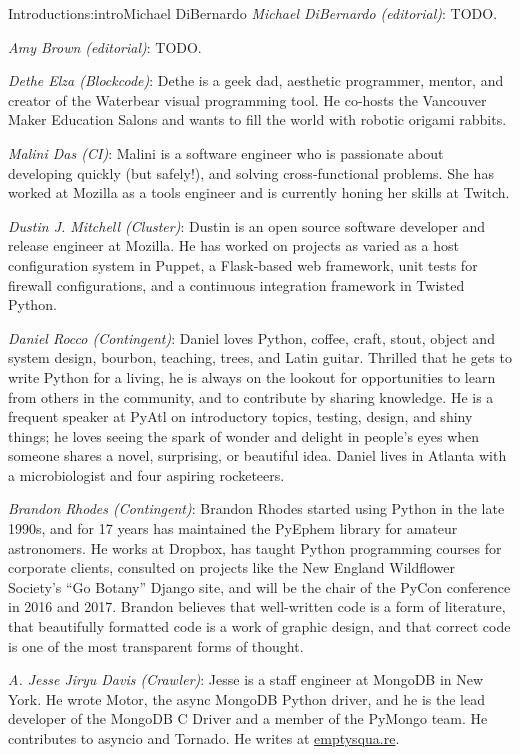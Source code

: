 \begin{aosachapter}{Introduction}{s:intro}{Michael DiBernardo}
\hspace{\parindent} \emph{Michael DiBernardo (editorial)}: TODO.

\hspace{\parindent} \emph{Amy Brown (editorial)}: TODO.

\emph{Dethe Elza (Blockcode)}: Dethe is a geek dad, aesthetic programmer, mentor, and creator of the Waterbear visual programming tool. He co-hosts the Vancouver Maker Education Salons and wants to fill the world with robotic origami rabbits. 

\emph{Malini Das (CI)}: Malini is a software engineer who is passionate about developing quickly (but safely!), and solving cross-functional problems. She has worked at Mozilla as a tools engineer and is currently honing her skills at Twitch. 

\emph{Dustin J. Mitchell (Cluster)}: Dustin is an open source software developer and release engineer at Mozilla. He has worked on projects as varied as a host configuration system in Puppet, a Flask-based web framework, unit tests for firewall configurations, and a continuous integration framework in Twisted Python. 

\emph{Daniel Rocco (Contingent)}: Daniel loves Python, coffee, craft, stout, object and system design, bourbon, teaching, trees, and Latin guitar. Thrilled that he gets to write Python for a living, he is always on the lookout for opportunities to learn from others in the community, and to contribute by sharing knowledge. He is a frequent speaker at PyAtl on introductory topics, testing, design, and shiny things; he loves seeing the spark of wonder and delight in people's eyes when someone shares a novel, surprising, or beautiful idea. Daniel lives in Atlanta with a microbiologist and four aspiring rocketeers.

\emph{Brandon Rhodes (Contingent)}: Brandon Rhodes started using Python in the late 1990s, and for 17 years has maintained the PyEphem library for amateur astronomers. He works at Dropbox, has taught Python programming courses for corporate clients, consulted on projects like the New England Wildflower Society's ``Go Botany'' Django site, and will be the chair of the PyCon conference in 2016 and 2017. Brandon believes that well-written code is a form of literature, that beautifully formatted code is a work of graphic design, and that correct code is one of the most transparent forms of thought.

\emph{A. Jesse Jiryu Davis (Crawler)}: Jesse is a staff engineer at MongoDB in New York. He wrote Motor, the async MongoDB Python driver, and he is the lead developer of the MongoDB C Driver and a member of the PyMongo team. He contributes to asyncio and Tornado. He writes at \url{emptysqua.re}.


\end{aosachapter}
